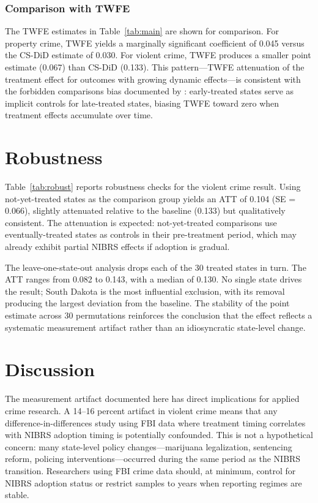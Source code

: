 \documentclass[12pt]{article}
\begin{document}
\subsubsection*{Comparison with TWFE} The TWFE estimates in Table~\ref{tab:main} are shown for comparison. For property crime, TWFE yields a marginally significant coefficient of 0.045 versus the CS-DiD estimate of 0.030. For violent crime, TWFE produces a smaller point estimate (0.067) than CS-DiD (0.133). This pattern---TWFE attenuation of the treatment effect for outcomes with growing dynamic effects---is consistent with the forbidden comparisons bias documented by \citet{goodman2021difference}: early-treated states serve as implicit controls for late-treated states, biasing TWFE toward zero when treatment effects accumulate over time.

\section{Robustness}

Table~\ref{tab:robust} reports robustness checks for the violent crime result. Using not-yet-treated states as the comparison group yields an ATT of 0.104 (SE = 0.066), slightly attenuated relative to the baseline (0.133) but qualitatively consistent. The attenuation is expected: not-yet-treated comparisons use eventually-treated states as controls in their pre-treatment period, which may already exhibit partial NIBRS effects if adoption is gradual.

The leave-one-state-out analysis drops each of the 30 treated states in turn. The ATT ranges from 0.082 to 0.143, with a median of 0.130. No single state drives the result; South Dakota is the most influential exclusion, with its removal producing the largest deviation from the baseline. The stability of the point estimate across 30 permutations reinforces the conclusion that the effect reflects a systematic measurement artifact rather than an idiosyncratic state-level change.

\section{Discussion}

The measurement artifact documented here has direct implications for applied crime research. A 14--16 percent artifact in violent crime means that any difference-in-differences study using FBI data where treatment timing correlates with NIBRS adoption timing is potentially confounded. This is not a hypothetical concern: many state-level policy changes---marijuana legalization, sentencing reform, policing interventions---occurred during the same period as the NIBRS transition. Researchers using FBI crime data should, at minimum, control for NIBRS adoption status or restrict samples to years when reporting regimes are stable.
\end{document}
